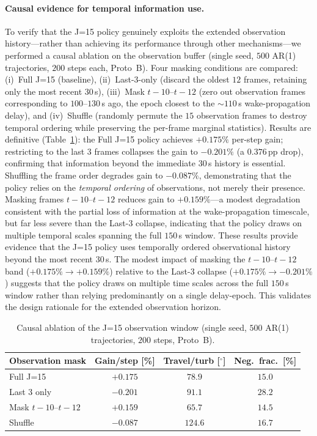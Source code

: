 \documentclass[final,5p,times]{elsarticle}
\begin{document}
\paragraph{Causal evidence for temporal information use.}
To verify that the J=15 policy genuinely exploits the extended observation history---rather than achieving its performance through other mechanisms---we performed a causal ablation on the observation buffer (single seed, $500$ AR(1) trajectories, $200$ steps each, Proto~B). Four masking conditions are compared: (i)~Full J=15 (baseline), (ii)~Last-3-only (discard the oldest $12$ frames, retaining only the most recent $30$\,s), (iii)~Mask $t{-}10$--$t{-}12$ (zero out observation frames corresponding to $100$--$130$\,s ago, the epoch closest to the ${\sim}110$\,s wake-propagation delay), and (iv)~Shuffle (randomly permute the $15$ observation frames to destroy temporal ordering while preserving the per-frame marginal statistics). Results are definitive (Table~\ref{tab:j15_causal}): the Full J=15 policy achieves $+0.175\%$ per-step gain; restricting to the last $3$ frames collapses the gain to $-0.201\%$ (a $0.376$\,pp drop), confirming that information beyond the immediate $30$\,s history is essential. Shuffling the frame order degrades gain to $-0.087\%$, demonstrating that the policy relies on the \emph{temporal ordering} of observations, not merely their presence. Masking frames $t{-}10$--$t{-}12$ reduces gain to $+0.159\%$---a modest degradation consistent with the partial loss of information at the wake-propagation timescale, but far less severe than the Last-3 collapse, indicating that the policy draws on multiple temporal scales spanning the full $150$\,s window. These results provide evidence that the J=15 policy uses temporally ordered observational history beyond the most recent $30$\,s. The modest impact of masking the $t{-}10$--$t{-}12$ band ($+0.175\%{\to}{+}0.159\%$) relative to the Last-3 collapse ($+0.175\%{\to}{-}0.201\%$) suggests that the policy draws on multiple time scales across the full $150$\,s window rather than relying predominantly on a single delay-epoch. This validates the design rationale for the extended observation horizon.

\begin{table}[h]
\centering
\caption{Causal ablation of the J=15 observation window (single seed, $500$ AR(1) trajectories, $200$ steps, Proto~B).}
\label{tab:j15_causal}
\small
\begin{tabular}{lccc}
\toprule
Observation mask & Gain/step [\%] & Travel/turb [$^\circ$] & Neg.\ frac.\ [\%] \\
\midrule
Full J=15 & $+0.175$ & $78.9$ & $15.0$ \\
Last 3 only & $-0.201$ & $91.1$ & $28.2$ \\
Mask $t{-}10$--$t{-}12$ & $+0.159$ & $65.7$ & $14.5$ \\
Shuffle & $-0.087$ & $124.6$ & $16.7$ \\
\bottomrule
\end{tabular}
\end{table}
\end{document}

